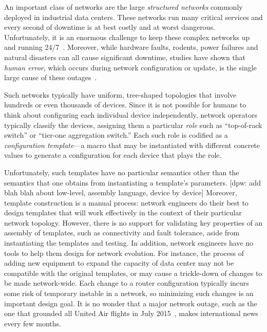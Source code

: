 \documentclass{sig-alternate-10pt}
\newcommand{\dpw}[1]{\textcolor{tmlblue}{[dpw: #1]}}
\begin{document}

An important class of networks are the large \emph{structured networks}
commonly deployed in industrial data centers.  These networks run
many critical services and every second of downtime is at best
costly and at worst dangerous.  Unfortunately, it is an enormous 
challenge to keep these complex networks up and
running 24/7~\cite{mahajan+:bgp-misconfiguration,feamster+:rcc,batfish,dc-failure-study}.
Moreover, while hardware faults, rodents, power failures and natural
disasters can all cause significant downtime, studies have shown that
\emph{human error}, which occurs during network configuration or
update, is the single large cause of these
outages~\cite{juniper-study}. 

Such networks typically have uniform, tree-shaped topologies that involve
hundreds or even thousands of devices.  Since it is not possible for humans
to think about configuring each individual device independently, 
network operators typically classify the devices, assigning them a particular
\emph{role} such as ``top-of-rack switch'' or ``tier-one aggregation switch.''
Each such role is codified as a \emph{configuration template}---a macro 
that may be instantiated with different concrete values to
generate a configuration for each device that plays the role.

Unfortunately, such templates have no particular semantics other than the 
semantics
that one obtains from instantiating a template's parameters.  
\dpw{add blah blah about low-level, assembly language, device by device}
Moreover,
template construction is a manual process:  network engineers do their
best to design templates that will work effectively in the context 
of their particular network topology.  However, there is no support for
validating key properties of an assembly of templates, such as connectivity 
and fault tolerance, 
aside from instantiating the templates and testing.  In addition,
network engineers have no tools to help them design for network
evolution.  For instance, the process of adding new equipment to
expand the capacity of data center may not be compatible with the original
templates, or may cause a trickle-down of changes to be made network-wide.
Each change to a router configuration typically incurs
some risk of temporary instable in a network, so minimizing such changes
is an important design goal.  It is no wonder that a major
network outage, such as the one that grounded all United Air flights
in July 2015~\cite{x}, makes international news every few months.
\end{document}
